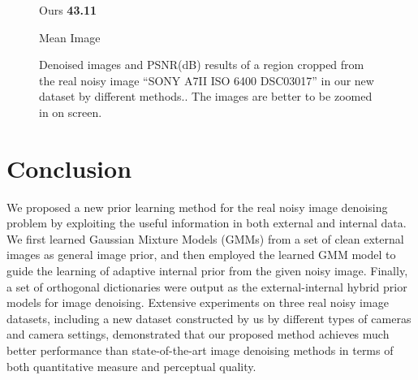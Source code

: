 \begin{figure}
{\begin{minipage}[t]{0.19\textwidth}
{\footnotesize Ours \textbf{43.11}}
\end{minipage}
\begin{minipage}[t]{0.19\textwidth}
\centering
{}
{\footnotesize Mean Image}
\end{minipage}
}
    \caption{Denoised images and PSNR(dB) results of a region cropped from the real noisy image ``SONY A7II ISO 6400 DSC03017'' in our new dataset by different methods.. The images are better to be zoomed in on screen.}
    \label{fig3-20}
\end{figure}


\section{Conclusion}

We proposed a new prior learning method for the real noisy image denoising problem by exploiting the useful information in both external and internal data. We first learned Gaussian Mixture Models (GMMs) from a set of clean external images as general image prior, and then employed the learned GMM model to guide the learning of adaptive internal prior from the given noisy image. Finally, a set of orthogonal dictionaries were output as the external-internal hybrid prior models for image denoising. Extensive experiments on three real noisy image datasets, including a new dataset constructed by us by different types of cameras and camera settings, demonstrated that our proposed method achieves much better performance than state-of-the-art image denoising methods in terms of both quantitative measure and perceptual quality.



